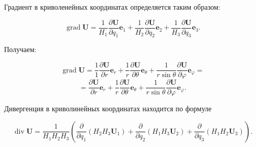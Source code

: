 \documentclass{article}
\begin{document}
\begin{enumerate}
{Градиент в криволенейных координатах определяется таким образом:

$$\operatorname{grad}\textbf{U} = \dfrac {1}{H_1} \dfrac {\partial \textbf{U}}{\partial q_1} \textbf{e}_1 + \dfrac {1}{H_2} \dfrac {\partial \textbf{U}}{\partial q_2} \textbf{e}_2 + \dfrac {1}{H_3} \dfrac {\partial \textbf{U}}{\partial q_3} \textbf{e}_3. $$

Получаем:

$$\operatorname{grad}\textbf{U} = \dfrac {1}{1} \dfrac {\partial \textbf{U}}{\partial r} \textbf{e}_r + \dfrac {1}{r} \dfrac {\partial \textbf{U}}{\partial \theta} \textbf{e}_\theta + \dfrac {1}{r \sin{\theta}} \dfrac {\partial \textbf{U}}{\partial \varphi} \textbf{e}_\varphi=$$
$$= \dfrac {\partial \textbf{U}}{\partial r} \textbf{e}_r + \dfrac {1}{r} \dfrac {\partial \textbf{U}}{\partial \theta} \textbf{e}_\theta + \dfrac {1}{r \sin{\theta}} \dfrac {\partial \textbf{U}}{\partial \varphi} \textbf{e}_\varphi.$$

Дивергенция в криволинейных координатах находится по формуле

$$\operatorname{div}\textbf{U} = \dfrac {1}{H_1 H_2 H_3} \left( \dfrac {\partial}{\partial q_1} \left(H_2 H_3 \textbf{U}_1\right) + \dfrac {\partial}{\partial q_2} \left(H_1 H_3 \textbf{U}_2\right) + \dfrac {\partial}{\partial q_3} \left(H_1 H_2 \textbf{U}_3\right)\right).$$

}
\end{enumerate}
\end{document}
